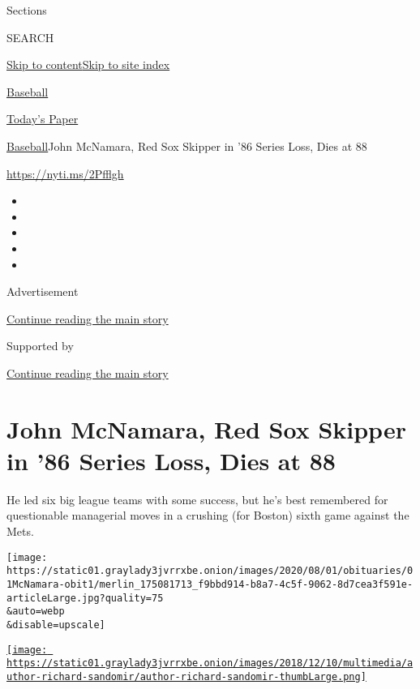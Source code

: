 Sections

SEARCH

\protect\hyperlink{site-content}{Skip to
content}\protect\hyperlink{site-index}{Skip to site index}

\href{https://www.nytimes3xbfgragh.onion/section/sports/baseball}{Baseball}

\href{https://myaccount.nytimes3xbfgragh.onion/auth/login?response_type=cookie\&client_id=vi}{}

\href{https://www.nytimes3xbfgragh.onion/section/todayspaper}{Today's
Paper}

\href{/section/sports/baseball}{Baseball}\textbar{}John McNamara, Red
Sox Skipper in '86 Series Loss, Dies at 88

\url{https://nyti.ms/2Pfflgh}

\begin{itemize}
\item
\item
\item
\item
\item
\end{itemize}

Advertisement

\protect\hyperlink{after-top}{Continue reading the main story}

Supported by

\protect\hyperlink{after-sponsor}{Continue reading the main story}

\hypertarget{john-mcnamara-red-sox-skipper-in-86-series-loss-dies-at-88}{%
\section{John McNamara, Red Sox Skipper in '86 Series Loss, Dies at
88}\label{john-mcnamara-red-sox-skipper-in-86-series-loss-dies-at-88}}

He led six big league teams with some success, but he's best remembered
for questionable managerial moves in a crushing (for Boston) sixth game
against the Mets.

\texttt{[image: https://static01.graylady3jvrrxbe.onion/images/2020/08/01/obituaries/01McNamara-obit1/merlin\_175081713\_f9bbd914-b8a7-4c5f-9062-8d7cea3f591e-articleLarge.jpg?quality=75\\\&auto=webp\\\&disable=upscale]}

\href{https://www.nytimes3xbfgragh.onion/by/richard-sandomir}{\texttt{[image: https://static01.graylady3jvrrxbe.onion/images/2018/12/10/multimedia/author-richard-sandomir/author-richard-sandomir-thumbLarge.png]}}

